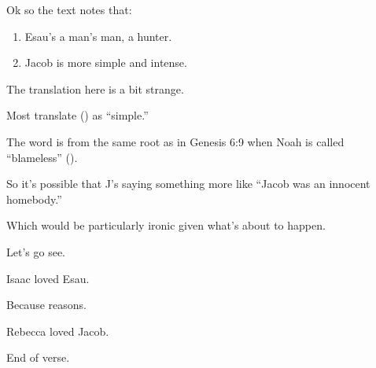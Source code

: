 {
}
{
}
{
	Ok so the text notes that:

	\begin{enumerate}
	\item Esau's a man's man, a hunter.
	\item Jacob is more simple and intense.
	\end{enumerate}

	The translation here is a bit strange.

	Most translate () as ``simple.''

	The word is from the same root as in Genesis 6:9 when Noah is called ``blameless'' ().

	So it's possible that J's saying something more like ``Jacob was an innocent homebody.''

	Which would be particularly ironic given what's about to happen.

	Let's go see.

}

{
}
{
}
{
	Isaac loved Esau.

	Because reasons.

	Rebecca loved Jacob.

	End of verse.
}

